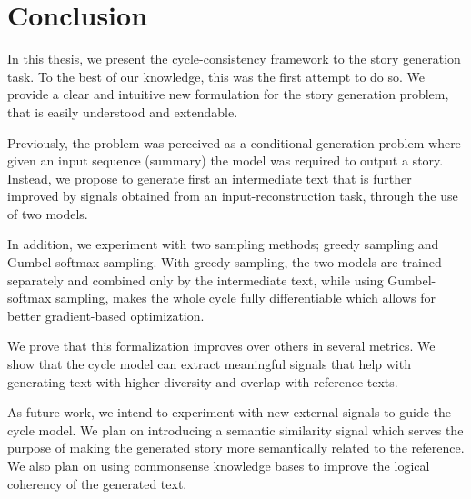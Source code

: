 \chapter{Conclusion}
\label{ch:conclusion}

In this thesis, we present the cycle-consistency framework to the story generation task. To the best of our knowledge, this was the first attempt to do so. We provide a clear and intuitive new formulation for the story generation problem, that is easily understood and extendable.

Previously, the problem was perceived as a conditional generation problem where given an input sequence (summary) the model was required to output a story. Instead, we propose to generate first an intermediate text that is further improved by signals obtained from an input-reconstruction task, through the use of two models.

In addition, we experiment with two sampling methods; greedy sampling and Gumbel-softmax sampling. With greedy sampling, the two models are trained separately and combined only by the intermediate text, while using Gumbel-softmax sampling, makes the whole cycle fully differentiable which allows for better gradient-based optimization.

We prove that this formalization improves over others in several metrics. We show that the cycle model can extract meaningful signals that help with generating text with higher diversity and overlap with reference texts.

As future work, we intend to experiment with new external signals to guide the cycle model. We plan on introducing a semantic similarity signal which serves the purpose of making the generated story more semantically related to the reference. We also plan on using commonsense knowledge bases to improve the logical coherency of the generated text.
